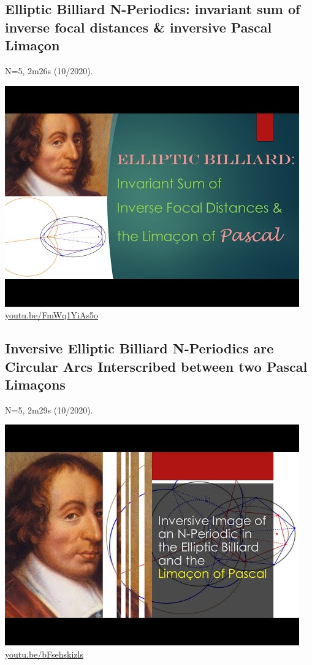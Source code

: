 \documentclass[12pt]{amsart}
\begin{document}
\subsection{Elliptic Billiard N-Periodics: invariant sum of inverse focal distances \& inversive Pascal Limaçon}
\label{vid:FmWq1YiAs5o}
\noindent N=5, 2m26s (10/2020). 
\begin{center}\includegraphics[width=.5\textwidth]{pics/FmWq1YiAs5o.jpg} \\ 
\href{https://youtu.be/FmWq1YiAs5o}{\url{youtu.be/FmWq1YiAs5o}}\end{center}
% 

\subsection{Inversive Elliptic Billiard N-Periodics are Circular Arcs Interscribed between two Pascal Limaçons}
\label{vid:bFsehskizls}
\noindent N=5, 2m29s (10/2020). 
\begin{center}\includegraphics[width=.5\textwidth]{pics/bFsehskizls.jpg} \\ 
\href{https://youtu.be/bFsehskizls}{\url{youtu.be/bFsehskizls}}\end{center}
% 
\end{document}
